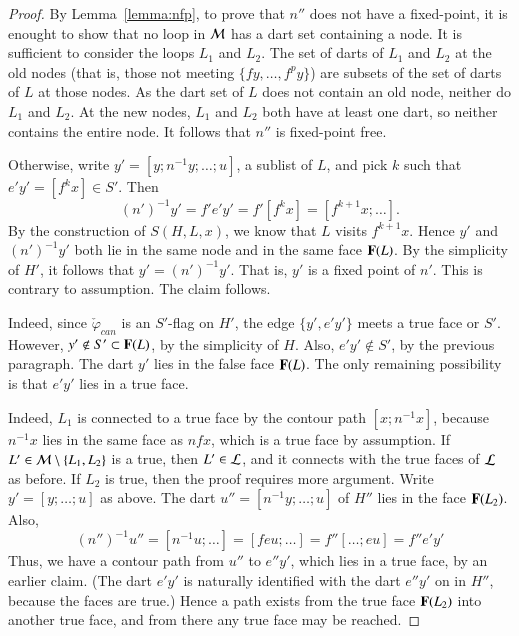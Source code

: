 \begin{proof}
 By Lemma~\ref{lemma:nfp}, to prove that $n''$
does not have a fixed-point, it is enought to show that no loop in
${\cal M}$ has a dart set containing a node.  It is sufficient to
consider the loops $L_1$ and $L_2$.  The set of darts of $L_1$ and
$L_2$ at the old nodes (that is, those not meeting $\{f y,\ldots,f^p
y\}$) are subsets of the set of darts of $L$ at those nodes.  As the
dart set of $L$ does not contain an old node, neither do $L_1$ and
$L_2$.  At the new nodes, $L_1$ and $L_2$ both have at least one dart,
so neither contains the entire node.  It follows that $n''$ is
fixed-point free.

Otherwise, write $y' = [y;n^{-1}y;\ldots;u]$, a sublist of $L$, and
pick $k$ such that $e'y' = [f^k x]\in S'$.  Then
\begin{displaymath}
(n')^{-1} y' = f'e'y' = f'[f^k x] = [f^{k+1}x;\ldots].
\end{displaymath}
By the construction of $S(H,L,x)$, we know that $L$ visits $f^{k+1}x$.
Hence $y'$ and $(n')^{-1}y'$ both lie in the same node and in the same
face ${\mathbf F}(L)$.  By the simplicity of $H'$, it follows that $y' =
(n')^{-1} y'$.  That is, $y'$ is a fixed point of $n'$.  This is contrary to
assumption. The claim follows.


  Indeed,
 since $\check\varphi_{can}$ is
an $S'$-flag on $H'$, the edge $\{y',e'y'\}$ meets a true face or
$S'$.  However, $y'\not\in S'\subset {\mathbf F}(L)$, by the simplicity of $H$.  Also,
$e'y'\not\in S'$, by the previous paragraph.
The dart $y'$ lies in the false face ${\mathbf F}(L)$.  The only
remaining possibility is that $e'y'$ lies in a true face.  



   Indeed,  $L_1$ is connected to a true face
by the contour path $[x;n^{-1} x]$, because $n^{-1} x$ lies
in the same face as $n f x$, which is a true face by assumption.
If $L'\in{\cal M}\setminus\{L_1,L_2\}$ is a true, then $L'\in  {\cal L}$, and
it connects with the true faces of ${\cal L}$ as before.
If $L_2$ is true, then the proof requires more
argument.   Write $y'=[y;\ldots;u]$ as above.
The dart $u''=[n^{-1}y;\ldots;u]$ of $H''$ lies in the face ${\mathbf F}(L_2)$.
Also, 
\begin{displaymath}
(n'')^{-1} u''= [n^{-1} u;\ldots] = [f e u;\ldots] = f'' [\ldots; e u]
  = f'' e' y'
\end{displaymath}
Thus, we have a contour path from $u''$ to $e'' y'$, which lies in a
true face, by an earlier claim.  (The dart $e'y'$ is naturally
identified with the dart $e'' y'$ on in $H''$, because the faces are
true.)  Hence a path exists from the true face ${\mathbf F}(L_2)$ into another
true face, and from there any true face may be reached.


\end{proof}
